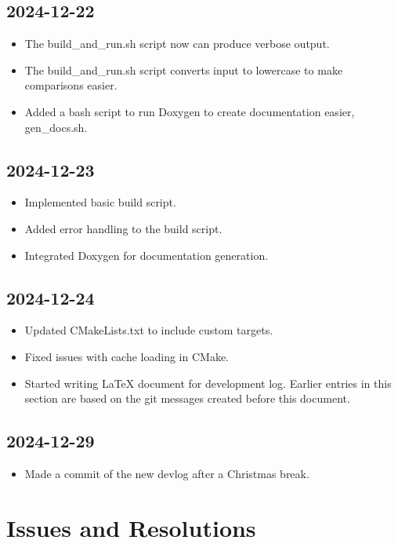 \documentclass[a4paper,12pt]{article}
\begin{document}
\subsection{2024-12-22}
\begin{itemize}
	\item The build\_and\_run.sh script now can produce verbose output.
	\item The build\_and\_run.sh script converts input to lowercase to make comparisons easier.
	\item Added a bash script to run Doxygen to create documentation easier, gen\_docs.sh.
	
\end{itemize}

\subsection{2024-12-23}
\begin{itemize}
    \item Implemented basic build script.
    \item Added error handling to the build script.
    \item Integrated Doxygen for documentation generation.
\end{itemize}

\subsection{2024-12-24}
\begin{itemize}
    \item Updated CMakeLists.txt to include custom targets.
    \item Fixed issues with cache loading in CMake.
    \item Started writing \LaTeX{} document for development log. Earlier entries in this section are based on the git messages created before this document.
\end{itemize}

\subsection{2024-12-29}
\begin{itemize}
	\item Made a commit of the new devlog after a Christmas break. 
\end{itemize}

\section{Issues and Resolutions}
\end{document}
